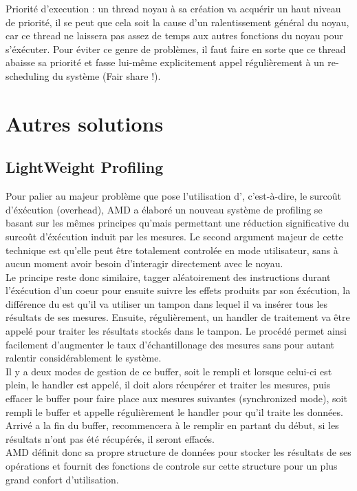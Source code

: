 							\item{Priorité d'execution : un thread noyau à sa création va acquérir un haut niveau de priorité, il se peut que cela soit la cause d'un ralentissement général du noyau, car ce thread ne laissera pas assez de temps aux autres fonctions du noyau pour s'éxécuter. Pour éviter ce genre de problèmes, il faut faire en sorte que ce thread abaisse sa priorité et fasse lui-même explicitement appel régulièrement à un re-scheduling du système (Fair share !).}
						\eitem
			\section{Autres solutions}
				\subsection{LightWeight Profiling}
					Pour palier au majeur problème que pose l'utilisation d'\IBS, c'est-à-dire, le surcoût d'éxécution (overhead), AMD a élaboré un nouveau système de profiling se basant sur les mêmes principes qu'\IBS mais permettant une réduction significative du surcoût d'éxécution induit par les mesures. Le second argument majeur de cette technique est qu'elle peut être totalement controlée en mode utilisateur, sans à aucun moment avoir besoin d'interagir directement avec le noyau.\\
					Le principe reste donc similaire, tagger aléatoirement des instructions durant l'éxécution d'un coeur pour ensuite suivre les effets produits par son éxécution, la différence du \lwp est qu'il va utiliser un tampon dans lequel il va insérer tous les résultats de ses mesures. Ensuite, régulièrement, un handler de traitement va être appelé pour traiter les résultats stockés dans le tampon. Le procédé permet ainsi facilement d'augmenter le taux d'échantillonage des mesures sans pour autant ralentir considérablement le système.\\
					Il y a deux modes de gestion de ce buffer, soit \lwp le rempli et lorsque celui-ci est plein, le handler est appelé, il doit alors récupérer et traiter les mesures, puis effacer le buffer pour faire place aux mesures suivantes (synchronized mode), soit \lwp rempli le buffer et appelle régulièrement le handler pour qu'il traite les données. Arrivé a la fin du buffer, \lwp recommencera à le remplir en partant du début, si les résultats n'ont pas été récupérés, il seront effacés.\\
					AMD définit donc sa propre structure de données pour stocker les résultats de ses opérations et fournit des fonctions de controle sur cette structure pour un plus grand confort d'utilisation.
